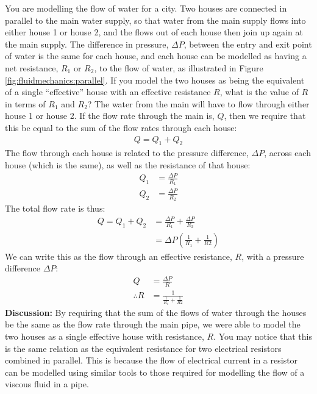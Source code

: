 {{\begin{example}{
You are modelling the flow of water for a city. Two houses are connected in parallel to the main water supply, so that water from the main supply flows into either house 1 or house 2, and the flows out of each house then join up again at the main supply. The difference in pressure, $\Delta P$, between the entry and exit point of water is the same for each house, and each house can be modelled as having a net resistance, $R_{1}$ or $R_2$, to the flow of water, as illustrated in Figure \ref{fig:fluidmechanics:parallel}. If you model the two houses as being the equivalent of a single ``effective'' house with an effective resistance $R$, what is the value of $R$ in terms of $R_1$ and $R_2$?}
The water from the main will have to flow through either house 1 or house 2. If the flow rate through the main is, $Q$, then we require that this be equal to the sum of the flow rates through each house:
\begin{align*}
Q = Q_1 + Q_2
\end{align*}
The flow through each house is related to the pressure difference, $\Delta P$, across each house (which is the same), as well as the resistance of that house:
\begin{align*}
Q_1 &= \frac{\Delta P}{R_1}\\
Q_2 &= \frac{\Delta P}{R_2}
\end{align*}
The total flow rate is thus:
\begin{align*}
Q = Q_1 + Q_2&=\frac{\Delta P}{R_1}+\frac{\Delta P}{R_2}\\
&=\Delta P \left(\frac{1}{R_1}+\frac{1}{R2}\right)
\end{align*}
We can write this as the flow through an effective resistance, $R$, with a pressure difference $\Delta P$:
\begin{align*}
Q &= \frac{\Delta P}{R}\\
\therefore R&= \frac{1}{\frac{1}{R_1}+\frac{1}{R2}}
\end{align*}
\textbf{Discussion: }By requiring that the sum of the flows of water through the houses be the same as the flow rate through the main pipe, we were able to model the two houses as a single effective house with resistance, $R$. You may notice that this is the same relation as the equivalent resistance for two electrical resistors combined in parallel. This is because the flow of electrical current in a resistor can be modelled using similar tools to those required for modelling the flow of a viscous fluid in a pipe. 
\end{example}


}}
